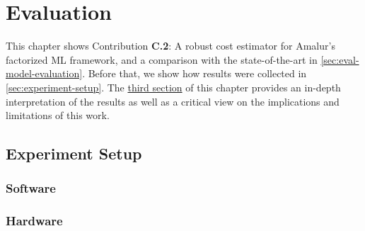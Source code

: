
\chapter{Evaluation}
\label{chapter:evaluation-discussion}
This chapter shows Contribution \textbf{C.2}: A robust cost estimator for Amalur's factorized ML framework, and a comparison with the state-of-the-art in \autoref{sec:eval-model-evaluation}. Before that, we show how results were collected in \autoref{sec:experiment-setup}. The \hyperref[sec:eval-discussion]{third section} of this chapter provides an in-depth interpretation of the results as well as a critical view on the implications and limitations of this work.

\section{Experiment Setup}

\label{sec:experiment-setup}


\subsection{Software}



\subsection{Hardware}

